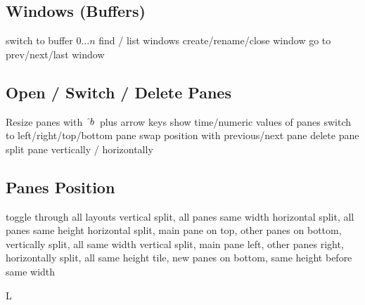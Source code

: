 \subsection{Windows (Buffers)}{}
	{switch to buffer $0 \ldots n$}
	{find / list windows}
	{create/rename/close window}
	{go to prev/next/last window}

\subsection{Open / Switch / Delete Panes}{Resize panes with $\ctrl b$\esc\ plus arrow keys}
	{show time/numeric values of panes}
	{switch to left/right/top/bottom pane}
	{swap position with previous/next pane}
	{delete pane}
	{split pane vertically / horizontally}


\subsection{Panes Position}{}
	{toggle through all layouts}
	{vertical split, all panes same width}
	{horizontal split, all panes same height}
	{horizontal split, main pane on top, other panes on bottom, vertically split, all same width}
	{vertical split, main pane left, other panes right, horizontally split, all same height}
	{tile, new panes on bottom, same height before same width}

\copyrightnotice

\supereject
\if L\lr \else\null\vfill\eject\fi
\bye

